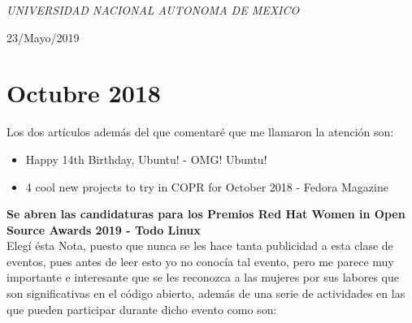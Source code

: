 \documentclass[a4paper, 11pt, oneside]{article}
\begin{document}
\begin{titlepage}
	\textit{UNIVERSIDAD NACIONAL AUTONOMA DE MEXICO} 
	
	\vfill
	
	
	
	
	\vspace{0.3\baselineskip} 
	
    23/Mayo/2019 
	
	 

\end{titlepage}
\section*{Octubre 2018}
Los dos artículos además del que comentaré que me llamaron la atención son:
\begin{itemize}
    \item Happy 14th Birthday, Ubuntu! - OMG! Ubuntu!
    \item 4 cool new projects to try in COPR for October 2018 - Fedora Magazine
\end{itemize}
\textbf{Se abren las candidaturas para los Premios Red Hat Women in Open Source Awards 2019 - Todo Linux}\\
Elegí ésta Nota, puesto que nunca se les hace tanta publicidad a esta clase de eventos, pues antes de leer esto yo no conocía tal evento, pero me parece muy importante e interesante que se les reconozca a las mujeres por sus labores que son significativas en el código abierto, además de una serie de actividades en las que pueden participar durante dicho evento como son:
\end{document}
